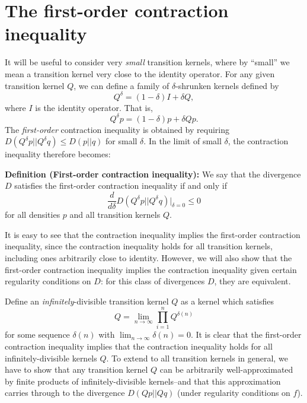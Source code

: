 \documentclass[12pt]{article}
\begin{document}
\section{The first-order contraction inequality}

It will be useful to consider very \emph{small} transition kernels,
where by ``small'' we mean a transition kernel very close to the
identity operator.  For any given transition kernel $Q$, we can define
a family of $\delta$-shrunken kernels defined by
\[
Q^\delta = (1-\delta) I + \delta Q,
\]
where $I$ is the identity operator.  That is,
\begin{equation}\label{eq:Q_delta}
Q^\delta p = (1-\delta) p + \delta Qp.
\end{equation}
The \emph{first-order} contraction inequality is obtained by requiring
$D(Q^\delta p||Q^\delta q) \leq D(p||q)$ for small $\delta$.  In the
limit of small $\delta$, the contraction inequality therefore becomes:


\noindent\textbf{Definition (First-order contraction inequality):}
We say that the divergence $D$ satisfies the first-order contraction inequality if and only if
\[
\frac{d}{d\delta}D(Q^\delta p||Q^\delta q)|_{\delta = 0} \leq 0
\]
for all densities $p$ and all transition kernels $Q$.

It is easy to see that the contraction inequality implies the
first-order contraction inequality, since the contraction inequality
holds for all transition kernels, including ones arbitrarily close to
identity.  However, we will also show that the first-order contraction
inequality implies the contraction inequality given certain regularity
conditions on $D$: for this class of divergences $D$, they are
equivalent.

Define an \emph{infinitely}-divisible transition kernel $Q$ as a
kernel which satisfies
\[
Q = \lim_{n\to \infty} \prod_{i=1}^n Q^{\delta(n)}
\]
for some sequence $\delta(n)$ with
$\lim_{n \to \infty} \delta(n) = 0$.  It is clear that the
first-order contraction inequality implies that the contraction
inequality holds for all infinitely-divisible kernels $Q$.  To extend
to all transition kernels in general, we have to show that any
transition kernel $Q$ can be arbitrarily well-approximated by finite
products of infinitely-divisible kernels--and that this approximation
carries through to the divergence $D(Qp||Qq)$ (under regularity
conditions on $f$).
\end{document}
